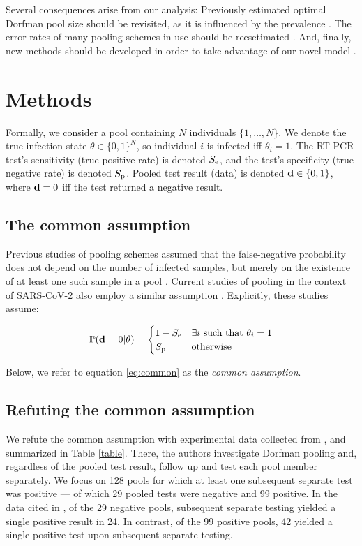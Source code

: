 \documentclass{article}
\begin{document}
Several consequences arise from our analysis: Previously estimated optimal Dorfman
pool size should be revisited, as it is influenced by the prevalence \cite{OptimalDorfmanPool}. The error
rates of many pooling schemes in use should be reesetimated
\cite{BayesianDorfman, Kim}. And, finally, new methods should be
developed in order to take advantage of our novel model \cite{DOPE}.

\section*{Methods}
Formally, we consider a pool containing $N$ individuals
$\{1,\dots,N\}$. We denote the true infection state $\theta \in
\{0,1\}^N$, so individual $i$ is infected iff $\theta_i=1$. The RT-PCR
test's sensitivity (true-positive rate) is denoted $S_{\text{e}}$, and the
test's specificity (true-negative rate) is denoted $S_{\text{p}}$. Pooled
test result (data) is denoted $\mathbf{d} \in \{0,1\}$, where $\mathbf{d}=0$ iff
the test returned a negative result.

\subsection*{The common assumption}\label{subsec:common}
Previous studies of pooling schemes assumed that the false-negative
probability does not depend on the number of infected samples, but
merely on the existence of at least one such sample in a pool
\cite{Kim, OptimalDorfmanPool}. Current studies of pooling in the
context of SARS-CoV-2 also employ a similar assumption
\cite{Simplistic1, Simplistic2}. Explicitly, these studies assume:

\begin{align}\label{eq:common}
  \mathbb{P}(\mathbf{d}=0|\theta) = 
  \begin{cases} 
    1-S_{\text{e}} & \exists i\ \text{such that } \theta_i = 1\\
    S_{\text{p}} & \text{otherwise}
  \end{cases} 
\end{align}

Below, we refer to equation \eqref{eq:common} as the \emph{common
  assumption}. 

\subsection*{Refuting the common assumption}\label{subsec:refute}
We refute the common assumption with experimental data collected from
\cite{Salazar}, and summarized in Table \ref{table}. There, the
authors investigate Dorfman pooling and, regardless of the pooled test
result, follow up and test each pool member separately. We focus on
128 pools for which at least one subsequent separate test was positive
--- of which 29 pooled tests were negative and 99 positive. In the
data cited in \cite{Salazar}, of the 29 negative pools, subsequent
separate testing yielded a single positive result in 24. In contrast,
of the 99 positive pools, 42 yielded a single positive test upon
subsequent separate testing.
\end{document}
